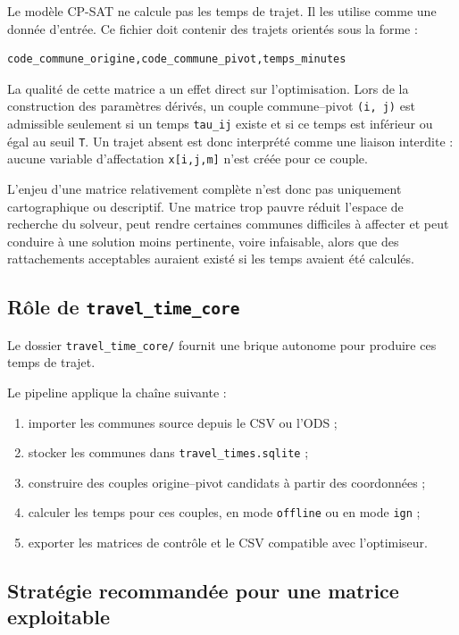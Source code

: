 \documentclass[11pt,a4paper]{article}
\begin{document}
Le modèle CP-SAT ne calcule pas les temps de trajet. Il
les utilise comme une donnée d'entrée.
Ce fichier doit contenir des trajets orientés sous la forme :

\begin{verbatim}
code_commune_origine,code_commune_pivot,temps_minutes
\end{verbatim}

La qualité de cette matrice a un effet direct sur l'optimisation. Lors de la
construction des paramètres dérivés, un couple commune--pivot \texttt{(i, j)}
est admissible seulement si un temps \texttt{tau\_ij} existe et si ce temps est
inférieur ou égal au seuil \texttt{T}. Un trajet absent est donc interprété
comme une liaison interdite : aucune variable d'affectation \texttt{x[i,j,m]}
n'est créée pour ce couple.

L'enjeu d'une matrice relativement complète n'est donc pas uniquement
cartographique ou descriptif. Une matrice trop pauvre réduit l'espace de
recherche du solveur, peut rendre certaines communes difficiles à affecter et
peut conduire à une solution moins pertinente, voire infaisable, alors que des
rattachements acceptables auraient existé si les temps avaient été
calculés.

\subsection{Rôle de \texttt{travel\_time\_core}}

Le dossier \texttt{travel\_time\_core/} fournit une brique autonome pour produire
ces temps de trajet.

Le pipeline applique la chaîne
suivante :

\begin{enumerate}
\item importer les communes source depuis le CSV ou l'ODS ;
\item stocker les communes dans \texttt{travel\_times.sqlite} ;
\item construire des couples origine--pivot candidats à partir des coordonnées ;
\item calculer les temps pour ces couples, en mode \texttt{offline} ou en mode \texttt{ign} ;
\item exporter les matrices de contrôle et le CSV compatible avec l'optimiseur.
\end{enumerate}

\subsection{Stratégie recommandée pour une matrice exploitable}
\end{document}
